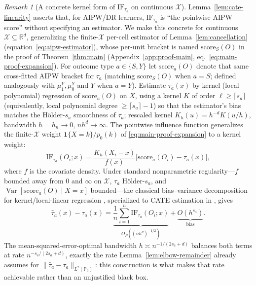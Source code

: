 \documentclass[11pt]{article}
\theoremstyle{plain}
\theoremstyle{definition}
\theoremstyle{remark}
\newtheorem{remark}[theorem]{Remark}
\newcommand{\PP}{\mathbb{P}}
\newcommand{\R}{\mathbb{R}}
\newcommand{\cX}{\mathcal{X}}
\newcommand{\IF}{\mathrm{IF}}
\DeclareMathOperator{\Var}{Var}
\begin{document}
\begin{remark}[A concrete kernel form of $\IF_{\tau_a}$ on continuous $\cX$]\label{rem:kernel-IF-concrete}
Lemma~\ref{lem:cate-linearity} asserts that, for AIPW/DR-learners, $\IF_{\tau_a}$ is
``the pointwise AIPW score'' without specifying an estimator. We make this concrete
for continuous $\cX\subseteq\R^d$, generalizing the finite-$\cX$ per-cell estimator of
Lemma~\ref{lem:cancellation} (equation~\eqref{eq:aipw-estimator}), whose per-unit
bracket is named $\mathrm{score}_S(O)$ in the proof of Theorem~\ref{thm:main}
(Appendix~\ref{app:proof-main}, eq.~\eqref{eq:main-proof-expansion}). For outcome
type $a\in\{S,Y\}$ let $\mathrm{score}_a(O)$ denote that same cross-fitted AIPW
bracket for $\tau_a$ (matching $\mathrm{score}_S(O)$ when $a=S$; defined analogously
with $\mu_1^Y,\mu_0^Y$ and $Y$ when $a=Y$). Estimate $\tau_a(x)$ by kernel (local
polynomial) regression of $\mathrm{score}_a(O)$ on $X$, using a kernel $K$ of order
$\ell\geq\lceil s_a\rceil$ (equivalently, local polynomial degree
$\geq\lceil s_a\rceil-1$) so that the estimator's bias matches the Hölder-$s_a$
smoothness of $\tau_a$; rescaled kernel $K_h(u)=h^{-d}K(u/h)$, bandwidth $h=h_n\to0$,
$nh^d\to\infty$. The pointwise influence function generalizes the
finite-$\cX$ weight $\mathbf 1\{X{=}k\}/p_0(k)$ of \eqref{eq:main-proof-expansion} to
a kernel weight:
\begin{equation}\label{eq:kernel-IF}
    \IF_{\tau_a}(O_i;x) = \frac{K_h(X_i-x)}{f(x)}\Big[\mathrm{score}_a(O_i)-\tau_a(x)\Big],
\end{equation}
where $f$ is the covariate density. Under standard nonparametric regularity---$f$
bounded away from $0$ and $\infty$ on $\cX$, $\tau_a$ H\"older-$s_a$, and
$\Var[\mathrm{score}_a(O)\mid X{=}x]$ bounded---the classical bias--variance
decomposition for kernel/local-linear regression \citep{Stone1980}, specialized to
CATE estimation in \citet{Kennedy2024Minimax}, gives
\begin{equation}\label{eq:kernel-bias-variance}
    \hat\tau_a(x)-\tau_a(x) = \underbrace{\frac1n\sum_{i=1}^n\IF_{\tau_a}(O_i;x)}_{O_P\left((nh^d)^{-1/2}\right)}
        + \underbrace{O(h^{s_a})}_{\text{bias}}.
\end{equation}
The mean-squared-error-optimal bandwidth $h\asymp n^{-1/(2s_a+d)}$ balances both
terms at rate $n^{-s_a/(2s_a+d)}$, exactly the rate Lemma~\ref{lem:elbow-remainder}
already assumes for $\|\hat\tau_a-\tau_a\|_{L^2(\PP_0)}$: this construction is what
makes that rate achievable rather than an unjustified black box.


\end{remark}
\end{document}
